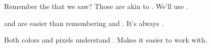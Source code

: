 
	\graphicspath{{figs/}{figs/objects/}}

Remember the  that we saw?  Those are akin to .  We'll use .

 and  are easier than remembering  and .  It's always .

Both colors and pixels understand .  Makes it easier to work with.


